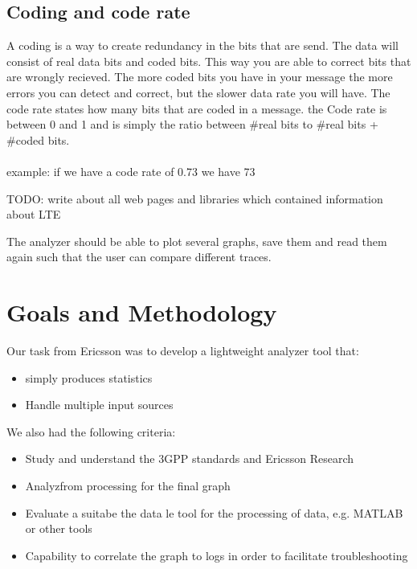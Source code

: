 \documentclass[cropmarks, frame, english]{idamasterthesis}
\begin{document}
\subsection{Coding and code rate}
A coding is a way to create redundancy in the bits that are send. The data will consist of real data bits and coded bits. This way you are able to correct bits that are wrongly recieved. The more coded bits you have in your message the more errors you can detect and correct, but the slower data rate you will have. The code rate states how many bits that are coded in a message. the Code rate is between 0 and 1 and is simply the ratio between #real bits to #real bits + #coded bits. 
\\ \\
example: if we have a code rate of 0.73 we have 73%





 


TODO: write about all web pages and libraries which contained information about LTE

The analyzer should be able to plot several graphs, save them and read them again such that the user can compare different traces.

\section{Goals and Methodology}

Our task from Ericsson was to develop a lightweight analyzer tool that:

 \begin{itemize} 
 \item simply produces statistics
 \item Handle multiple input sources
 \end{itemize} 

\setlength{\parindent}{0cm} We also had the following criteria: 
 
  \begin{itemize} 
 \item Study and understand the 3GPP standards and Ericsson Research
 \item Analyzfrom processing for the final graph
 \item Evaluate a suitabe the data le tool for the processing of data, e.g. MATLAB or other tools
 \item Capability to correlate the graph to logs in order to facilitate troubleshooting
\end{itemize}
\end{document}
